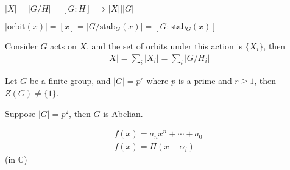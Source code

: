 \begin{corollary}
$|X| = |G/H| = [G:H] \implies |X| \bigl\vert |G|$
\end{corollary}

\begin{corollary}
$|\text{orbit}(x)| = [x] = |G/\text{stab}_G(x)| = [G:\text{stab}_G(x)]$
\end{corollary}

\begin{corollary}
Consider $G$ acts on $X$, and the set of orbits under this action is $\{ X_i \}$, then
\begin{align*}
    |X| = \sum_{i} |X_i| = \sum_{i} |G/H_i|
\end{align*}
\end{corollary}
\begin{observe}
    
\end{observe}
\begin{prop}
Let $G$ be a finite group, and $|G| = p^{r}$ where $p$ is a prime and $r\ge 1$, then $Z(G) \neq \{ 1 \}$.
\end{prop}
\begin{corollary}
Suppose $|G| = p^{2}$, then $G$ is Abelian.
\end{corollary}


\newpage
\begin{definition}[polynomial]
    \begin{align*}
        f(x) = a_n x^{n} +\cdots + a_0
        \\f(x) = \Pi (x-\alpha_i)
    \end{align*}
    (in $\mathbb{C}$)
\end{definition}



